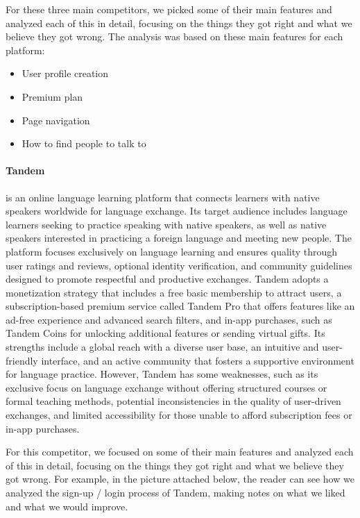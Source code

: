 For these three main competitors, we picked some of their main features and analyzed each of this in detail, focusing on the things they got right and what we believe they got wrong.
The analysis was based on these main features for each platform:
\begin{itemize}
    \item User profile creation
    \item Premium plan
    \item Page navigation
    \item How to find people to talk to
\end{itemize}

\paragraph{Tandem} is an online language learning platform that connects learners with native speakers worldwide for language exchange.
Its target audience includes language learners seeking to practice speaking with native speakers, as well as native speakers interested in practicing a foreign language and meeting new people.
The platform focuses exclusively on language learning and ensures quality through user ratings and reviews, optional identity verification, and community guidelines designed to promote respectful and productive exchanges.
Tandem adopts a monetization strategy that includes a free basic membership to attract users, a subscription-based premium service called Tandem Pro that offers features like an ad-free experience and advanced search filters, and in-app purchases, such as Tandem Coins for unlocking additional features or sending virtual gifts.
Its strengths include a global reach with a diverse user base, an intuitive and user-friendly interface, and an active community that fosters a supportive environment for language practice.
However, Tandem has some weaknesses, such as its exclusive focus on language exchange without offering structured courses or formal teaching methods, potential inconsistencies in the quality of user-driven exchanges, and limited accessibility for those unable to afford subscription fees or in-app purchases.

For this competitor, we focused on some of their main features and analyzed each of this in detail, focusing on the things they got right and what we believe they got wrong.
For example, in the picture attached below, the reader can see how we analyzed the sign-up / login process of Tandem, making notes on what we liked and what we would improve.


